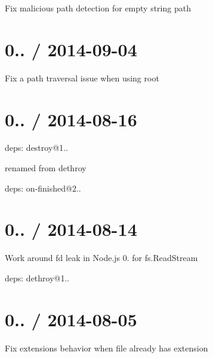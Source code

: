 \begin{DoxyItemize}
\item Fix malicious path detection for empty string path
\end{DoxyItemize}

\section*{0.. / 2014-\/09-\/04 }


\begin{DoxyItemize}
\item Fix a path traversal issue when using {\ttfamily root}
\end{DoxyItemize}

\section*{0.. / 2014-\/08-\/16 }


\begin{DoxyItemize}
\item deps\+: destroy@1..
\begin{DoxyItemize}
\item renamed from dethroy
\end{DoxyItemize}
\item deps\+: on-\/finished@2..
\end{DoxyItemize}

\section*{0.. / 2014-\/08-\/14 }


\begin{DoxyItemize}
\item Work around {\ttfamily fd} leak in Node.\+js 0. for {\ttfamily fs.\+Read\+Stream}
\item deps\+: dethroy@1..
\end{DoxyItemize}

\section*{0.. / 2014-\/08-\/05 }


\begin{DoxyItemize}
\item Fix {\ttfamily extensions} behavior when file already has extension
\end{DoxyItemize}


